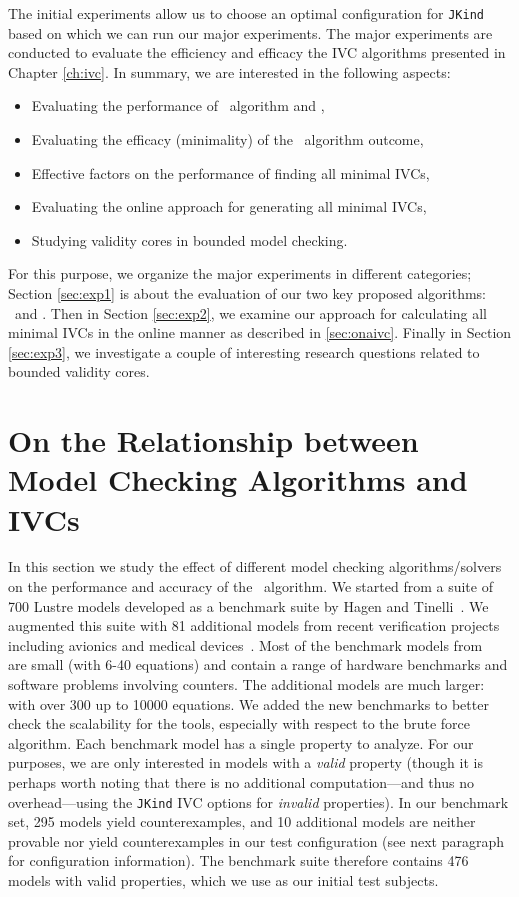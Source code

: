 The initial experiments allow us to choose an optimal configuration for \texttt{JKind} based on which we can run our major experiments. The major experiments are conducted to evaluate the efficiency and efficacy the IVC algorithms presented in Chapter \ref{ch:ivc}.
In summary, we are interested in the following aspects:

\begin{itemize}
  \item Evaluating the performance of \ucalg\ algorithm and \aivcalg ,
  \item Evaluating the efficacy (minimality) of the \ucalg\ algorithm outcome,
  \item Effective factors on the performance of finding all minimal IVCs,
  \item Evaluating the online approach for generating all minimal IVCs,
  \item Studying validity cores in bounded model checking.
\end{itemize}
\noindent For this purpose, we organize the major experiments in different categories; Section \ref{sec:exp1} is about the evaluation of our two key proposed algorithms: \ucalg\ and \aivcalg . Then in Section \ref{sec:exp2}, we examine our approach for calculating all minimal IVCs in the online manner as described in \ref{sec:onaivc}. Finally in Section \ref{sec:exp3}, we investigate a couple of interesting research questions related to bounded validity cores.

\section{On the Relationship between Model Checking Algorithms and IVCs}
\label{sec:exprinit}
In this section we study the effect of different model checking algorithms/solvers on the performance and accuracy of the \ucalg\ algorithm. We started from a suite of 700 Lustre models developed
as a benchmark suite by Hagen and Tinelli~\cite{Hagen08:FMCAD}. We augmented this suite
with 81 additional models from recent verification projects including
avionics and medical devices~\cite{QFCS15:backes,hilt2013}. Most of
the benchmark models from~\cite{Hagen08:FMCAD} are small (with 6-40 equations) and contain a range of hardware benchmarks and
software problems involving counters. The additional models are much
larger: with over 300 up to 10000 equations. We added the new
benchmarks to better check the scalability for the tools, especially
with respect to the brute force algorithm.
%
Each benchmark model has a single property to analyze.  For our purposes, we are only interested in models with a {\em valid} property (though it is perhaps worth noting that there is no additional computation---and thus no overhead---using the \texttt{JKind} IVC options for {\em invalid} properties).  In our benchmark set, 295 models yield counterexamples, and 10 additional models are neither provable nor yield counterexamples in our test configuration (see next paragraph for configuration information).  The benchmark suite therefore contains 476 models with valid properties, which we use as our initial test subjects.

